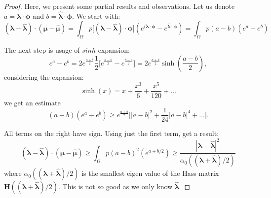 \documentclass{article}
\def\vc#1{\mathbf{\boldsymbol{#1}}}     %
\def\tn#1{\boldsymbol{#1}}
\def\R{\mathbf{R}}
\def\vl{{\vc\lambda}}
\def\estvl{{\vc{\hat\lambda}}}
\def\vmu{\vc\mu}
\def\estvmu{{\vc{\hat\mu}}}
\def\vphi{\vc\phi}
\begin{document}
\begin{proof}

Here, we present some partial results and observations.
Let us denote $a=\vl\cdot\vphi$ and $b = \estvl\cdot\vphi$. We start with:
\[
  (\vl - \estvl)\cdot(\vmu - \estvmu)
      = \int_{\Omega} p \big[(\vl - \estvl)\cdot\vphi\big] (e^{(\vl\cdot\vphi} - e^{\estvl\cdot\vphi})
      =\int_{\Omega} p (a - b)(e^a - e^b)
\]

The next step is usage of $sinh$ expansion:
\[
 e^a - e^b = 2 e^{\frac{a+b}{2}}\frac{1}{2}\Big[e^{\frac{a-b}{2}} - e^{\frac{b-a}{2}}\Big] = 
 2 e^{\frac{a+b}{2}}\sinh(\frac{a-b}{2}),
\]
considering the expansion:
\[
    \sinh(x) = x + \frac{x^3}{6} + \frac{x^5}{120} + \dots
\]
we get an estimate
 \[
  (a-b)(e^a - e^b) \ge e^{\frac{a+b}{2}}\Big[|a-b|^2 + \frac{1}{24}|a-b|^4 + \dots\Big].
 \]

 All terms on the right have sign. Using just the first term, get a result:
\[
  (\vl - \estvl)\cdot(\vmu - \estvmu) \ge \int_{\Omega} p (a - b)^2(e^{a+b/2})
   \ge \frac{|\vl - \estvl|^2}{\alpha_0((\vl + \estvl)/2)}
\]
where $\alpha_0((\vl + \estvl)/2)$ is the smallest eigen value of the Hass matrix
$\tn H((\vl + \estvl)/2)$. This is not so good as we only know $\estvl$. 

 
 
 


% 
% 
%  
% 
% 
% 
% 
%  
% 
%  
 

\end{proof}
\end{document}
